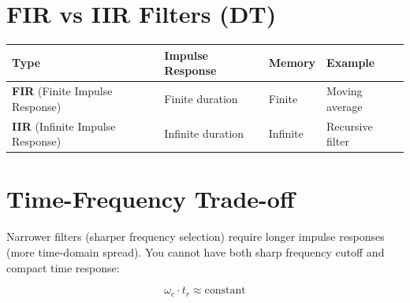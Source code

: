 \documentclass[11pt]{article}
\begin{document}
\section*{FIR vs IIR Filters (DT)}

\begin{center}
\begin{tabular}{|l|l|l|l|}
\hline
\textbf{Type} & \textbf{Impulse Response} & \textbf{Memory} & \textbf{Example} \\
\hline
\textbf{FIR} (Finite Impulse Response) & Finite duration & Finite & Moving average \\
\hline
\textbf{IIR} (Infinite Impulse Response) & Infinite duration & Infinite & Recursive filter \\
\hline
\end{tabular}
\end{center}

\section*{Time-Frequency Trade-off}

Narrower filters (sharper frequency selection) require longer impulse responses (more time-domain spread). You cannot have both sharp frequency cutoff and compact time response:

\[\omega_c \cdot t_r \approx \text{constant}\]
\end{document}
